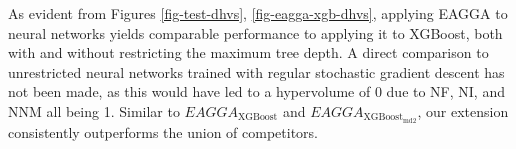 \documentclass[twoside,11pt]{article}
\begin{document}
\begin{figure}
  \centering
\end{figure}
As evident from Figures \ref{fig-test-dhvs}, \ref{fig-eagga-xgb-dhvs}, applying EAGGA to neural networks yields comparable performance to applying it to XGBoost,
both with and without restricting the maximum tree depth.
A direct comparison to unrestricted neural networks trained with regular stochastic gradient descent has not been made, as this would have led to a hypervolume of 0
due to NF, NI, and NNM all being 1.
Similar to $EAGGA_{\text{XGBoost}}$ and $EAGGA_{\text{XGBoost}_{\text{md2}}}$, our extension consistently outperforms the union of competitors.
\end{document}
